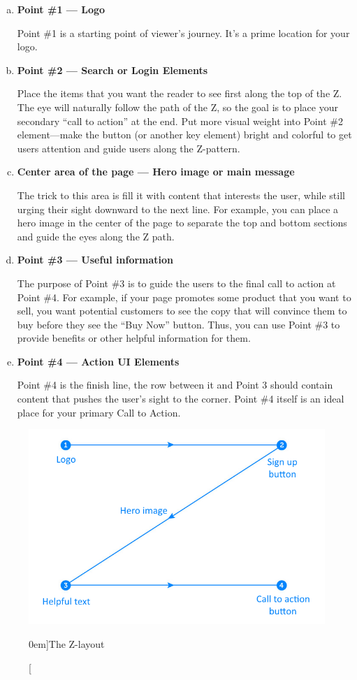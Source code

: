 \begin{enumerate}[(a)]
	\item \textbf{Point \#1 --- Logo} \par Point \#1 is a starting point of viewer’s journey. It’s a prime location for your logo.
	\item \textbf{Point \#2 --- Search or Login Elements} \par Place the items that you want the reader to see first along the top of the Z. The eye will naturally follow the path of the Z, so the goal is to place your secondary ``call to action'' at the end. Put more visual weight into Point \#2 element---make the button (or another key element) bright and colorful to get users attention and guide users along the Z-pattern.
	\item \textbf{Center area of the page --- Hero image or main message} \par The trick to this area is fill it with content that interests the user, while still urging their sight downward to the next line. For example, you can place a hero image in the center of the page to separate the top and bottom sections and guide the eyes along the Z path.
	\item \textbf{Point \#3 --- Useful information} \par The purpose of Point \#3 is to guide the users to the final call to action at Point \#4. For example, if your page promotes some product that you want to sell, you want potential customers to see the copy that will convince them to buy before they see the ``Buy Now'' button. Thus, you can use Point \#3 to provide benefits or other helpful information for them.
	\item \textbf{Point \#4 --- Action UI Elements} \par Point \#4 is the finish line, the row between it and Point 3 should contain content that pushes the user’s sight to the corner. Point \#4 itself is an ideal place for your primary Call to Action.
\end{enumerate}


\begin{figure}%
	\centering
  \includegraphics[width=1\textwidth]{../figures/z-shape.png}
  \caption[][0em]{The Z-layout}
  \label{fig:z-layout}
\end{figure}
	

